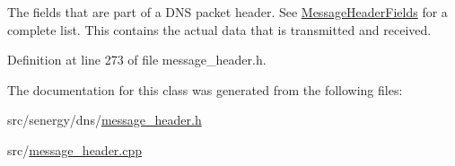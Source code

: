 The fields that are part of a D\-N\-S packet header. See \hyperlink{struct_senergy_1_1_dns_1_1_message_header_fields}{Message\-Header\-Fields} for a complete list. This contains the actual data that is transmitted and received. 



Definition at line 273 of file message\-\_\-header.\-h.



The documentation for this class was generated from the following files\-:\begin{DoxyCompactItemize}
\item 
src/senergy/dns/\hyperlink{message__header_8h}{message\-\_\-header.\-h}\item 
src/\hyperlink{message__header_8cpp}{message\-\_\-header.\-cpp}\end{DoxyCompactItemize}
